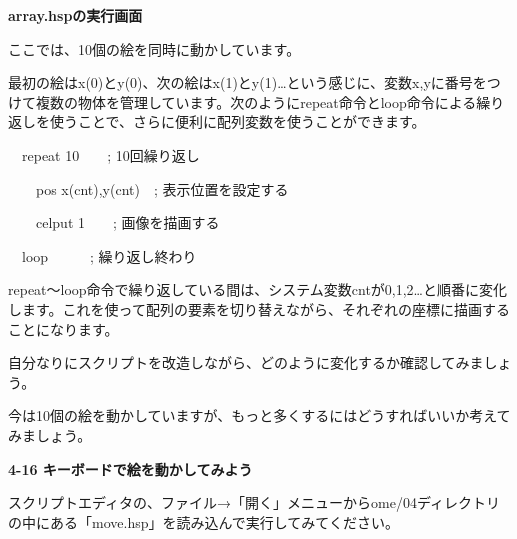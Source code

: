 \documentclass[a4paper,dvipdfmx]{jarticle}
\newcommand\textstyleqwerty[1]{#1}
\begin{document}
\bigskip


\bigskip


\bigskip

\textstyleqwerty{\textbf{array.hspの実行画面}}


\bigskip


\bigskip


\bigskip


\bigskip

ここでは、10個の絵を同時に動かしています。

最初の絵はx(0)とy(0)、次の絵はx(1)とy(1)…という感じに、変数x,yに番号をつけて複数の物体を管理しています。次のようにrepeat命令とloop命令による繰り返しを使うことで、さらに便利に配列変数を使うことができます。


\bigskip

\ \ repeat 10\ \ \ \ ; 10回繰り返し

\ \ \ \ pos x(cnt),y(cnt)\ \ ; 表示位置を設定する

\ \ \ \ celput 1\ \ \ \ ; 画像を描画する

\ \ loop\ \ \ \ \ \ ; 繰り返し終わり


\bigskip

repeat〜loop命令で繰り返している間は、システム変数cntが0,1,2…と順番に変化します。これを使って配列の要素を切り替えながら、それぞれの座標に描画することになります。


\bigskip

自分なりにスクリプトを改造しながら、どのように変化するか確認してみましょう。

今は10個の絵を動かしていますが、もっと多くするにはどうすればいいか考えてみましょう。


\bigskip


\bigskip

{\bfseries
4-16 キーボードで絵を動かしてみよう}


\bigskip

スクリプトエディタの、ファイル→「開く」メニューからome/04ディレクトリの中にある「move.hsp」を読み込んで実行してみてください。
\end{document}
